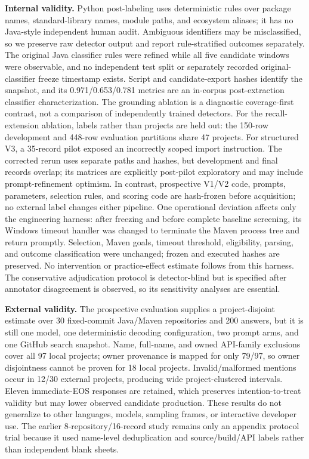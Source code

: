 \documentclass[pdflatex,sn-basic]{sn-jnl}
\begin{document}
\textbf{Internal validity.} Python post-labeling uses deterministic rules over package names, standard-library names, module paths, and ecosystem aliases; it has no Java-style independent human audit. Ambiguous identifiers may be misclassified, so we preserve raw detector output and report rule-stratified outcomes separately. The original Java classifier rules were refined while all five candidate windows were observable, and no independent test split or separately recorded original-classifier freeze timestamp exists. Script and candidate-export hashes identify the snapshot, and its 0.971/0.653/0.781 metrics are an in-corpus post-extraction classifier characterization. The grounding ablation is a diagnostic coverage-first contrast, not a comparison of independently trained detectors. For the recall-extension ablation, labels rather than projects are held out: the 150-row development and 448-row evaluation partitions share 47 projects. For structured V3, a 35-record pilot exposed an incorrectly scoped import instruction. The corrected rerun uses separate paths and hashes, but development and final records overlap; its matrices are explicitly post-pilot exploratory and may include prompt-refinement optimism. In contrast, prospective V1/V2 code, prompts, parameters, selection rules, and scoring code are hash-frozen before acquisition; no external label changes either pipeline. One operational deviation affects only the engineering harness: after freezing and before complete baseline screening, its Windows timeout handler was changed to terminate the Maven process tree and return promptly. Selection, Maven goals, timeout threshold, eligibility, parsing, and outcome classification were unchanged; frozen and executed hashes are preserved. No intervention or practice-effect estimate follows from this harness. The conservative adjudication protocol is detector-blind but is specified after annotator disagreement is observed, so its sensitivity analyses are essential.

\textbf{External validity.} The prospective evaluation supplies a project-disjoint estimate over 30 fixed-commit Java/Maven repositories and 200 answers, but it is still one model, one deterministic decoding configuration, two prompt arms, and one GitHub search snapshot. Name, full-name, and owned API-family exclusions cover all 97 local projects; owner provenance is mapped for only 79/97, so owner disjointness cannot be proven for 18 local projects. Invalid/malformed mentions occur in 12/30 external projects, producing wide project-clustered intervals. Eleven immediate-EOS responses are retained, which preserves intention-to-treat validity but may lower observed candidate production. These results do not generalize to other languages, models, sampling frames, or interactive developer use. The earlier 8-repository/16-record study remains only an appendix protocol trial because it used name-level deduplication and source/build/API labels rather than independent blank sheets.
\end{document}
